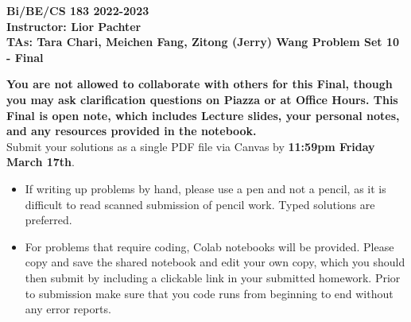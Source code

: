 \documentclass[11pt]{exam}
\begin{document}
\begin{center}

     \textbf{Bi/BE/CS 183 2022-2023\\ Instructor: Lior Pachter\\ TAs: Tara Chari, Meichen Fang, Zitong (Jerry) Wang \vskip 0.15in Problem Set 10 - Final}

\end{center}


 \vskip 0.15in

\textbf{You are not allowed to collaborate with others for this Final, though you may ask clarification questions on Piazza or at Office Hours. This Final is open note, which includes Lecture slides, your personal notes, and any resources provided in the notebook.} \\

Submit your solutions as a single PDF file via Canvas by {\bf 11:59pm Friday March 17th}. 
\begin{itemize}
  \item If writing up problems by hand, please use a pen and not a pencil, as it is difficult to read scanned submission of pencil work. Typed solutions are preferred.
  \item For problems that require coding, Colab notebooks will be provided. Please copy and save the shared notebook and edit your own copy, which you should then submit by including a clickable link in your submitted homework. Prior to submission make sure that you code runs from beginning to end without any error reports.
  \end{itemize}
\end{document}
